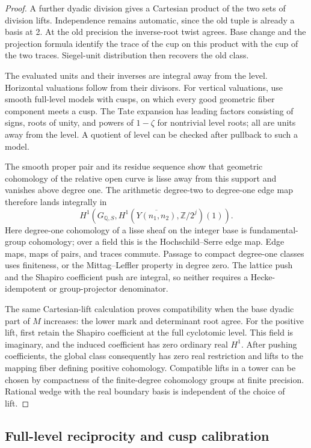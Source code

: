 \begin{proof}
A further dyadic division gives a Cartesian product of the two sets of
division lifts.  Independence remains automatic, since the old tuple is
already a basis at 2.  At the old precision the inverse-root twist agrees.
Base change and the projection formula identify the trace of the cup on
this product with the cup of the two traces.  Siegel-unit distribution
then recovers the old class.

The evaluated units and their inverses are integral away from the level.
Horizontal valuations follow from their divisors.  For vertical
valuations, use smooth full-level models with cusps, on which every good
geometric fiber component meets a cusp.  The Tate expansion has leading
factors consisting of signs, roots of unity, and powers of \(1-\zeta\)
for nontrivial level roots; all are units away from the level.
A quotient of level can be checked after pullback to such a model.

The smooth proper pair and its residue sequence show that geometric
cohomology of the relative open curve is lisse away from this support
and vanishes above degree one.  The arithmetic degree-two to degree-one
edge map therefore lands integrally in
\[
 H^1\!\left(G_{\mathbb Q,S},
       H^1(\overline{Y(n_1,n_2)},\mathbb Z/2^j)(1)\right).
\]
Here degree-one cohomology of a lisse sheaf on the integer base is
fundamental-group cohomology; over a field this is the
Hochschild--Serre edge map.  Edge maps, maps of pairs, and traces commute.
Passage to compact degree-one classes uses finiteness, or the
Mittag--Leffler property in degree zero.  The lattice push and the
Shapiro coefficient push are integral, so neither requires a
Hecke-idempotent or group-projector denominator.

The same Cartesian-lift calculation proves compatibility when the base
dyadic part of \(M\) increases: the lower mark and determinant root agree.
For the positive lift, first retain the Shapiro coefficient at the full
cyclotomic level.  This field is imaginary, and the induced coefficient
has zero ordinary real \(H^1\).  After pushing coefficients, the global
class consequently has zero real restriction and lifts to the mapping
fiber defining positive cohomology.  Compatible lifts in a tower can be
chosen by compactness of the finite-degree cohomology groups at finite
precision.  Rational wedge with the real boundary basis is independent
of the choice of lift.
\end{proof}

\subsection{Full-level reciprocity and cusp calibration}

